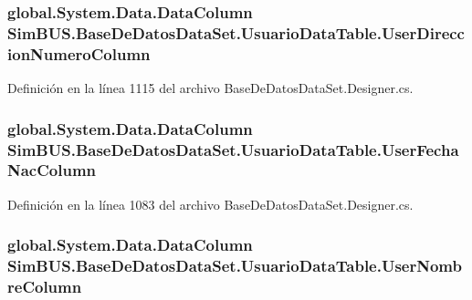 \subsubsection[{User\-Direccion\-Numero\-Column}]{\setlength{\rightskip}{0pt plus 5cm}global.\-System.\-Data.\-Data\-Column Sim\-B\-U\-S.\-Base\-De\-Datos\-Data\-Set.\-Usuario\-Data\-Table.\-User\-Direccion\-Numero\-Column\hspace{0.3cm}{\ttfamily [get]}}\label{class_sim_b_u_s_1_1_base_de_datos_data_set_1_1_usuario_data_table_a2a636cb70c647e8492a8df5bee9345a7}


Definición en la línea 1115 del archivo Base\-De\-Datos\-Data\-Set.\-Designer.\-cs.

\subsubsection[{User\-Fecha\-Nac\-Column}]{\setlength{\rightskip}{0pt plus 5cm}global.\-System.\-Data.\-Data\-Column Sim\-B\-U\-S.\-Base\-De\-Datos\-Data\-Set.\-Usuario\-Data\-Table.\-User\-Fecha\-Nac\-Column\hspace{0.3cm}{\ttfamily [get]}}\label{class_sim_b_u_s_1_1_base_de_datos_data_set_1_1_usuario_data_table_a1f36cf1dd3d2ce8e536c87268ece9a69}


Definición en la línea 1083 del archivo Base\-De\-Datos\-Data\-Set.\-Designer.\-cs.

\subsubsection[{User\-Nombre\-Column}]{\setlength{\rightskip}{0pt plus 5cm}global.\-System.\-Data.\-Data\-Column Sim\-B\-U\-S.\-Base\-De\-Datos\-Data\-Set.\-Usuario\-Data\-Table.\-User\-Nombre\-Column\hspace{0.3cm}{\ttfamily [get]}}\label{class_sim_b_u_s_1_1_base_de_datos_data_set_1_1_usuario_data_table_a7a1ffc056dbab977c8b877cd83ae1640}


